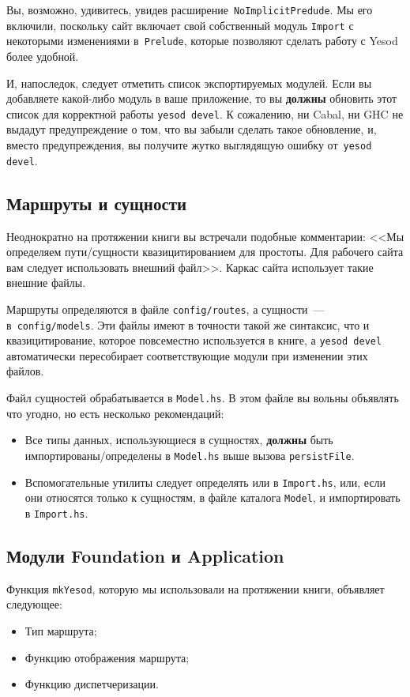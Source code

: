 Вы, возможно, удивитесь, увидев расширение~\lstinline!NoImplicitPredude!. Мы
его включили, поскольку сайт включает свой собственный модуль
\lstinline!Import! с некоторыми изменениями в~\lstinline!Prelude!, которые
позволяют сделать работу с Yesod более удобной.

И, напоследок, следует отметить список экспортируемых модулей. Если вы
добавляете какой-либо модуль в ваше приложение, то вы \textbf{должны} обновить
этот список для корректной работы \texttt{yesod devel}. К сожалению, ни Cabal,
ни GHC не выдадут предупреждение о том, что вы забыли сделать такое обновление,
и, вместо предупреждения, вы получите жутко выглядящую ошибку от~\texttt{yesod
    devel}.

\subsection{Маршруты и сущности}
Неоднократно на протяжении книги вы встречали подобные комментарии: <<Мы
определяем пути/сущности квазицитированием для простоты. Для рабочего сайта вам
следует использовать внешний файл>>.  Каркас сайта использует такие внешние
файлы.

Маршруты определяются в файле \texttt{config/routes}, а сущности~---
в~\texttt{config/models}.  Эти файлы имеют в точности такой же синтаксис, что и
квазицитирование, которое повсеместно используется в книге, а \texttt{yesod
devel} автоматически пересобирает соответствующие модули при изменении этих
файлов.

Файл сущностей обрабатывается в \texttt{Model.hs}. В этом файле вы вольны
объявлять что угодно, но есть несколько рекомендаций:
\begin{itemize}
    \item Все типы данных, использующиеся в сущностях, \textbf{должны} быть
        импортированы/определены в \texttt{Model.hs} выше вызова
        \lstinline!persistFile!.
    \item Вспомогательные утилиты следует определять или в \texttt{Import.hs},
        или, если они относятся только к сущностям, в файле каталога
        \texttt{Model}, и импортировать в \texttt{Import.hs}.
\end{itemize}

\subsection{Модули Foundation и Application}
Функция \lstinline!mkYesod!, которую мы использовали на протяжении книги,
объявляет следующее:
\begin{itemize}
  \item Тип маршрута;
  \item Функцию отображения маршрута;
  \item Функцию диспетчеризации.
\end{itemize}

